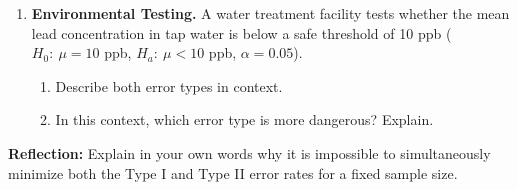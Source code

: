 \documentclass[10pt]{article}
\begin{document}
\begin{enumerate}
        \begin{enumerate}[label=\alph*.]
          \boxguard
          \item Describe a Type I error in context.
          \boxguard
          \item Describe a Type II error in context.
          \boxguard
          \item The district administrator wants to lower $\alpha$ to 0.01.
                Explain the trade-off this creates.
        \end{enumerate}

  \newpage
  \item \textbf{Environmental Testing.} A water treatment facility tests whether the
        mean lead concentration in tap water is below a safe threshold of 10 ppb
        ($H_0{:}\ \mu = 10$ ppb, $H_a{:}\ \mu < 10$ ppb, $\alpha = 0.05$).

        \begin{enumerate}[label=\alph*.]
          \boxguard
          \item Describe both error types in context.
          \boxguard
          \item In this context, which error type is more dangerous? Explain.
        \end{enumerate}

\end{enumerate}

\begin{reflectionbox}
\textbf{Reflection:} Explain in your own words why it is impossible to simultaneously
minimize both the Type I and Type II error rates for a fixed sample size.

\end{reflectionbox}
\end{document}
